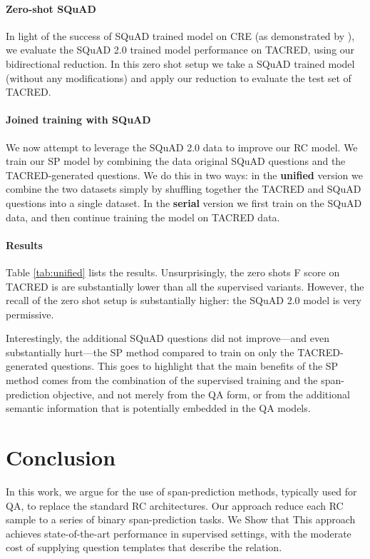 \documentclass[11pt]{article}
\begin{document}
\paragraph{Zero-shot SQuAD} In light of the success of SQuAD trained model on CRE (as demonstrated by \citet{Rosenman2020}), we evaluate the SQuAD 2.0 trained model performance on TACRED, using our bidirectional reduction. In this zero shot setup we take a SQuAD trained model (without any modifications) and apply our reduction to evaluate the test set of TACRED.

\paragraph{Joined training with SQuAD}
We now attempt to leverage the SQuAD 2.0 data  to improve our RC model. We train our SP model by combining the data original SQuAD questions and the TACRED-generated questions. We do this in two ways: in the \textbf{unified} version we combine the two datasets simply by shuffling together the TACRED and SQuAD questions into a single dataset. In the \textbf{serial} version we first train on the SQuAD data, and then continue training the model on TACRED data.

\paragraph{Results} 
Table \ref{tab:unified} lists the results.
Unsurprisingly, the zero shots F score on TACRED is are substantially lower than all the supervised variants. However, the recall of the zero shot setup is substantially higher: the SQuAD 2.0 model is very permissive. 

Interestingly, the additional SQuAD questions did not improve---and even substantially hurt---the SP method compared to train on only the TACRED-generated questions. This goes to highlight that the main benefits of the SP method comes from the combination of the supervised training and the span-prediction objective, and not merely from the QA form, or from the additional semantic information that is potentially embedded in the QA models.

\section{Conclusion}
In this work, we argue for the use of span-prediction methods, typically used for QA, to replace the standard RC architectures. Our approach reduce each RC sample to a series of binary span-prediction tasks. We Show that This approach achieves state-of-the-art performance in supervised settings, with the moderate cost of supplying question templates that describe the relation. 
\end{document}
